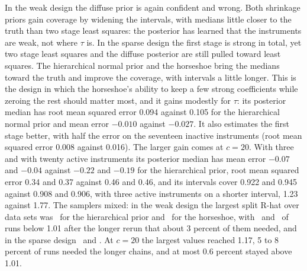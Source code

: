 

In the weak design the diffuse prior is again confident and wrong. Both shrinkage priors gain coverage by widening the intervals, with medians little closer to the truth than two stage least squares: the posterior has learned that the instruments are weak, not where $\tau$ is. In the sparse design the first stage is strong in total, yet two stage least squares and the diffuse posterior are still pulled toward least squares. The hierarchical normal prior and the horseshoe bring the medians toward the truth and improve the coverage, with intervals a little longer. This is the design in which the horseshoe's ability to keep a few strong coefficients while zeroing the rest should matter most, and it gains modestly for $\tau$: its posterior median has root mean squared error 0.094 against 0.105 for the hierarchical normal prior and mean error $-0.010$ against $-0.027$. It also estimates the first stage better, with half the error on the seventeen inactive instruments (root mean squared error 0.008 against 0.016). The larger gain comes at $c = 20$. With three and with twenty active instruments its posterior median has mean error $-0.07$ and $-0.04$ against $-0.22$ and $-0.19$ for the hierarchical prior, root mean squared error 0.34 and 0.37 against 0.46 and 0.46, and its intervals cover 0.922 and 0.945 against 0.908 and 0.906, with three active instruments on a shorter interval, 1.23 against 1.77. The samplers mixed: in the weak design the largest split R-hat over data sets was \ivhwhierrhat\ for the hierarchical prior and \ivhwhsrhat\ for the horseshoe, with \ivhwhiersh\ and \ivhwhssh\ of runs below 1.01 after the longer rerun that about 3 percent of them needed, and in the sparse design \ivhshierrhat\ and \ivhsrhat. At $c = 20$ the largest values reached 1.17, 5 to 8 percent of runs needed the longer chains, and at most 0.6 percent stayed above 1.01.

